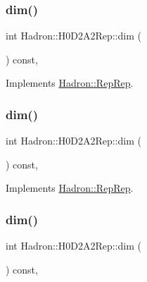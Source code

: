 \subsubsection{\texorpdfstring{dim()}{dim()}\hspace{0.1cm}{\footnotesize\ttfamily [3/5]}}
{\footnotesize\ttfamily int Hadron\+::\+H0\+D2\+A2\+Rep\+::dim (\begin{DoxyParamCaption}{ }\end{DoxyParamCaption}) const\hspace{0.3cm}{\ttfamily [inline]}, {\ttfamily [virtual]}}



Implements \mbox{\hyperlink{structHadron_1_1RepRep_a92c8802e5ed7afd7da43ccfd5b7cd92b}{Hadron\+::\+Rep\+Rep}}.

\mbox{\label{structHadron_1_1H0D2A2Rep_adb95283717eaea61e9e0681f2b9dda63}} 
\subsubsection{\texorpdfstring{dim()}{dim()}\hspace{0.1cm}{\footnotesize\ttfamily [4/5]}}
{\footnotesize\ttfamily int Hadron\+::\+H0\+D2\+A2\+Rep\+::dim (\begin{DoxyParamCaption}{ }\end{DoxyParamCaption}) const\hspace{0.3cm}{\ttfamily [inline]}, {\ttfamily [virtual]}}



Implements \mbox{\hyperlink{structHadron_1_1RepRep_a92c8802e5ed7afd7da43ccfd5b7cd92b}{Hadron\+::\+Rep\+Rep}}.

\mbox{\label{structHadron_1_1H0D2A2Rep_adb95283717eaea61e9e0681f2b9dda63}} 
\subsubsection{\texorpdfstring{dim()}{dim()}\hspace{0.1cm}{\footnotesize\ttfamily [5/5]}}
{\footnotesize\ttfamily int Hadron\+::\+H0\+D2\+A2\+Rep\+::dim (\begin{DoxyParamCaption}{ }\end{DoxyParamCaption}) const\hspace{0.3cm}{\ttfamily [inline]}, {\ttfamily [virtual]}}



